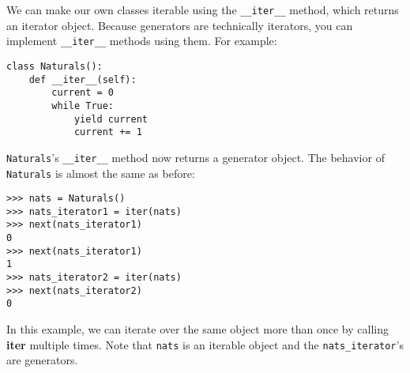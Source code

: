 We can make our own classes iterable using the \lstinline$__iter__$ method,
which returns an iterator object. Because generators are technically iterators,
you can implement \lstinline$__iter__$ methods using them. For example:

\begin{lstlisting}
class Naturals():
    def __iter__(self):
        current = 0
        while True:
            yield current
            current += 1
\end{lstlisting}

\lstinline$Naturals$'s \lstinline$__iter__$ method now returns a generator
object. The behavior of \lstinline$Naturals$ is almost the same as before:

\begin{lstlisting}
>>> nats = Naturals()
>>> nats_iterator1 = iter(nats)
>>> next(nats_iterator1)
0
>>> next(nats_iterator1)
1
>>> nats_iterator2 = iter(nats)
>>> next(nats_iterator2)
0
\end{lstlisting}

In this example, we can iterate over the same object more than once by calling
\textbf{iter} multiple times. Note that \lstinline$nats$ is an iterable
object and the \lstinline$nats_iterator$'s are generators.
